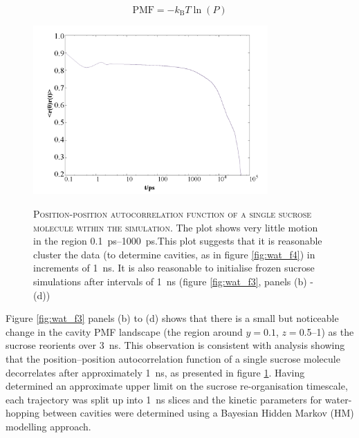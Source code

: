 \begin{equation}\label{eqn:pmf}
\mathrm{PMF}=-k_{\mathrm{B}} T \ln (P)
\end{equation}

\begin{figure}
    \centering
    \caption[Position-position autocorrelation function of a single sucrose molecule within the simulation]{\textsc{Position-position autocorrelation function of a single sucrose molecule within the simulation}. The plot shows very little motion in the region \SIrange{0.1}{1000}{\pico\second}.This plot suggests that it is reasonable cluster the data (to determine cavities, as in figure \ref{fig:wat_f4}) in increments of \SI{1}{\nano\second}. It is also reasonable to initialise frozen sucrose simulations after intervals of \SI{1}{\nano\second} (figure \ref{fig:wat_f3}, panels (b) - (d))}
    \includegraphics[width=0.8\textwidth]{chapters/water_hopping/figures/Fig_S8.png}
    \label{fig:wat_s8}
\end{figure}

Figure \ref{fig:wat_f3} panels (b) to (d) shows that there is a small but noticeable change in the cavity PMF landscape (the region around $y = 0.1$, $z = $\numrange[range-phrase=--]{0.5}{1}) as the sucrose reorients over \SI{3}{\nano\second}. This observation is consistent with analysis showing that the position–position autocorrelation function of a single sucrose molecule decorrelates after approximately \SI{1}{\nano\second}, as presented in figure \ref{fig:wat_s8}.  Having determined an approximate upper limit on the sucrose re-organisation timescale,  each trajectory was split up into \SI{1}{\nano\second} slices and  the kinetic parameters for water-hopping between cavities were determined using a Bayesian Hidden Markov (HM) modelling approach. 


